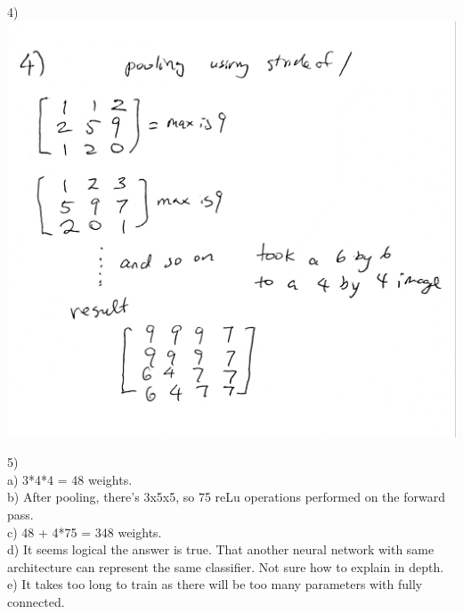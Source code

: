 \documentclass[11pt]{article}
\begin{document}
4) \\
\includegraphics[scale=0.12]{p4}

5) \\
a) 3*4*4 = 48 weights. \\
b) After pooling, there's 3x5x5, so 75 reLu operations performed on the forward pass. \\
c) 48 + 4*75 = 348 weights. \\
d) It seems logical the answer is true. That another neural network with same architecture can represent the same classifier. Not sure how to explain in depth. \\
e) It takes too long to train as there will be too many parameters with fully connected. \\
\end{document}
